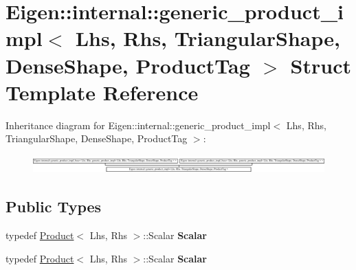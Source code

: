 \hypertarget{struct_eigen_1_1internal_1_1generic__product__impl_3_01_lhs_00_01_rhs_00_01_triangular_shape_00_4d5779e6000f2bc51bed3ea9b35ea4da}{}\section{Eigen\+:\+:internal\+:\+:generic\+\_\+product\+\_\+impl$<$ Lhs, Rhs, Triangular\+Shape, Dense\+Shape, Product\+Tag $>$ Struct Template Reference}
\label{struct_eigen_1_1internal_1_1generic__product__impl_3_01_lhs_00_01_rhs_00_01_triangular_shape_00_4d5779e6000f2bc51bed3ea9b35ea4da}
Inheritance diagram for Eigen\+:\+:internal\+:\+:generic\+\_\+product\+\_\+impl$<$ Lhs, Rhs, Triangular\+Shape, Dense\+Shape, Product\+Tag $>$\+:\begin{figure}[H]
\begin{center}
\leavevmode
\includegraphics[height=0.700876cm]{struct_eigen_1_1internal_1_1generic__product__impl_3_01_lhs_00_01_rhs_00_01_triangular_shape_00_4d5779e6000f2bc51bed3ea9b35ea4da}
\end{center}
\end{figure}
\subsection*{Public Types}
\begin{DoxyCompactItemize}
\item 
\mbox{\label{struct_eigen_1_1internal_1_1generic__product__impl_3_01_lhs_00_01_rhs_00_01_triangular_shape_00_4d5779e6000f2bc51bed3ea9b35ea4da_a21a4e3453caef0f96ffb1f1cf63abf6b}} 
typedef \hyperlink{group___core___module_class_eigen_1_1_product}{Product}$<$ Lhs, Rhs $>$\+::Scalar {\bfseries Scalar}
\item 
\mbox{\label{struct_eigen_1_1internal_1_1generic__product__impl_3_01_lhs_00_01_rhs_00_01_triangular_shape_00_4d5779e6000f2bc51bed3ea9b35ea4da_a21a4e3453caef0f96ffb1f1cf63abf6b}} 
typedef \hyperlink{group___core___module_class_eigen_1_1_product}{Product}$<$ Lhs, Rhs $>$\+::Scalar {\bfseries Scalar}
\end{DoxyCompactItemize}
